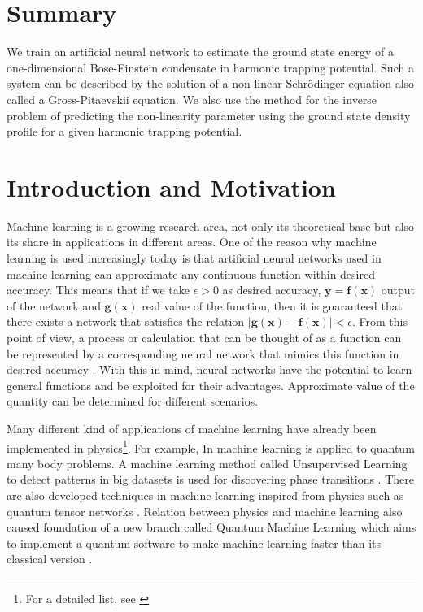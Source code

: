 \documentclass[a4paper,times,12pt]{article}
\begin{document}
\section*{Summary}

We train an artificial neural network to estimate the ground state energy
of a one-dimensional Bose-Einstein condensate in harmonic trapping potential.
Such a system can be described by the solution of a non-linear Schr{\"o}dinger equation also called a Gross-Pitaevskii equation. We also use the method for the inverse problem of predicting the non-linearity parameter using the ground
state density profile for a given harmonic trapping potential.

\newpage
\tableofcontents

\newpage

\section{Introduction and Motivation}
\label{sec:Intro}

Machine learning is a growing research area, not only its theoretical base but also its share in applications in different areas. One of the reason why machine learning is used increasingly today is that artificial neural networks used in machine learning can approximate any continuous function within desired accuracy. This means that if we take $\epsilon > 0$ as desired accuracy,  $\boldsymbol{y} = \boldsymbol{f}(\boldsymbol{x})$ output of the network and $\boldsymbol{g}(\boldsymbol{x})$ real value of the function, then it is guaranteed that there exists a network that satisfies the relation $|\boldsymbol{g}(\boldsymbol{x}) - \boldsymbol{f}(\boldsymbol{x})| < \epsilon $. From this point of view, a process or calculation that can be thought of as a function can be represented by a corresponding neural network that mimics this function in desired accuracy \cite{nielsen2015neural}. With this in mind, neural networks have the potential to learn general functions and be exploited for their advantages. Approximate value of the quantity can be determined for different scenarios.

Many different kind of applications of machine learning have already been implemented in physics\footnote{For a detailed list, see \cite{physicsml}}. For example, In \cite{carleo2017solving, cai2017approximating} machine learning is applied to quantum many body problems. A machine learning method called Unsupervised Learning to detect patterns in big datasets is used for discovering phase transitions \cite{wang2016discovering}. There are also developed techniques in machine learning inspired from physics such as quantum tensor networks \cite{stoudenmire2016supervised}. Relation between physics and machine learning also caused foundation of a new branch called Quantum Machine Learning which aims to implement a quantum software to make machine learning faster than its classical version \cite{biamonte1611quantum}. 
\end{document}
